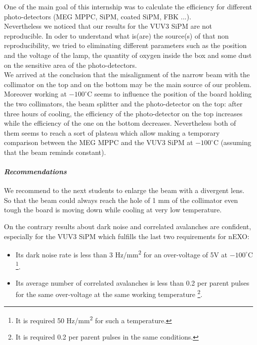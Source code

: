 \documentclass[a4paper, 11pt]{report}%
\begin{document}
  One of the main goal of this internship was to calculate the efficiency for different photo-detectors (MEG MPPC, SiPM, coated 
  SiPM, FBK ...).\\
  Nevertheless we noticed that our results for the VUV3 SiPM are not reproducible. In oder to understand what is(are) the source(s) of 
  that non reproducibility, we tried to eliminating different parameters such as the position and the voltage of the lamp, the quantity 
  of oxygen inside the box and some dust on the sensitive area of the photo-detectors.\\  
  We arrived at the conclusion that the misalignment of the narrow beam with the collimator on the top and on the bottom may be the main 
  source of our problem.\\
  Moreover working at $-100^\circ$C seems to influence the position of the board holding the two collimators, the beam splitter and the 
  photo-detector on the top: after three hours of cooling, the efficiency of the photo-detector on the top increases while the efficiency 
  of the one on the bottom decreases. Nevertheless both of them seems to reach a sort of plateau which allow making a temporary comparison 
  between the MEG MPPC and the VUV3 SiPM at $-100^\circ$C (assuming that the beam reminds constant).
  
  \paragraph{\textit{Recommendations }}
  
  We recommend to the next students to enlarge the beam with a divergent lens. So that the beam could always reach the hole of 1 mm of 
  the collimator even tough the board is moving down while cooling at very low temperature.
    
  On the contrary results about dark noise and correlated avalanches are confident, especially for the VUV3 SiPM which fulfills the last two
  requirements for nEXO:
  
  \begin{itemize}
   \item Its dark noise rate is less than 3 Hz/mm\textsuperscript{2} for an over-voltage of 5V at $-100^\circ$C 
   \footnote{It is required 50 Hz/mm\textsuperscript{2} for such a temperature.}.
   \item Its average number of correlated avalanches is less than 0.2 per parent pulses for the same over-voltage at the same working 
   temperature \footnote{It is required 0.2 per parent pulses in the same conditions.}.
  \end{itemize}
\end{document}
